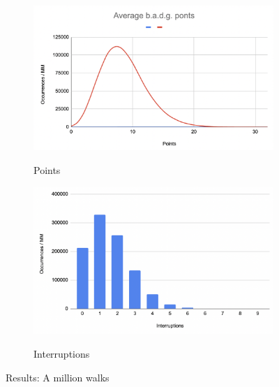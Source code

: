 \documentclass[11pt, oneside]{article} 	%
\begin{document}
\begin{figure}[!htb]
\begin{subfigure}{.5\textwidth}
\includegraphics[scale=0.4]{points}
\label{fig:averages}
\caption{Points}
\end{subfigure}
\begin{subfigure}{.5\textwidth}
\centering
\includegraphics[scale=0.4]{interruptions}
\label{fig:averages}
\caption{Interruptions}
\end{subfigure}
\caption{Results: A million walks}
\label{fig:results}
\end{figure}
\end{document}

